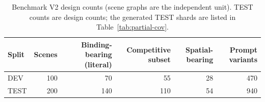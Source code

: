 \begin{table}[t]
\centering\small
\caption{Benchmark V2 design counts (scene graphs are the independent unit). TEST counts are design counts; the generated TEST shards are listed in Table~\ref{tab:partial-cov}.}
\label{tab:benchmark}
\begin{tabular}{lrrrrr}
\toprule
Split & Scenes & Binding-bearing (literal) & Competitive subset & Spatial-bearing & Prompt variants \\
\midrule
DEV & 100 & 70 & 55 & 28 & 470 \\
TEST & 200 & 140 & 110 & 54 & 940 \\
\bottomrule
\end{tabular}
\end{table}
